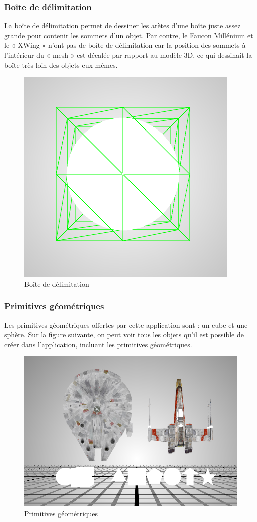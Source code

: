 \subsubsection{Boîte de délimitation}
La boîte de délimitation permet de dessiner les arètes d’une boîte juste assez grande pour contenir les sommets d’un objet. Par contre, le Faucon Millénium et le « XWing » n’ont pas de boîte de délimitation car la position des sommets à l’intérieur du « mesh » est décalée par rapport au modèle 3D, ce qui dessinait la boîte très loin des objets eux-mêmes.
\begin{figure}[H]
    \centering
	\includegraphics[scale=0.4]{fig/delimitation.PNG}
	\caption{Boîte de délimitation}
	\label{fig:box}
\end{figure}

\subsubsection{Primitives géométriques}
Les primitives géométriques offertes par cette application sont : un cube et une sphère.
Sur la figure suivante, on peut voir tous les objets qu'il est possible de créer dans l'application, incluant les primitives géométriques.
\begin{figure}[H]
    \centering
	\includegraphics[scale=0.8]{fig/shapes.PNG}
	\caption{Primitives géométriques}
	\label{fig:primitivesgeo}
\end{figure}

